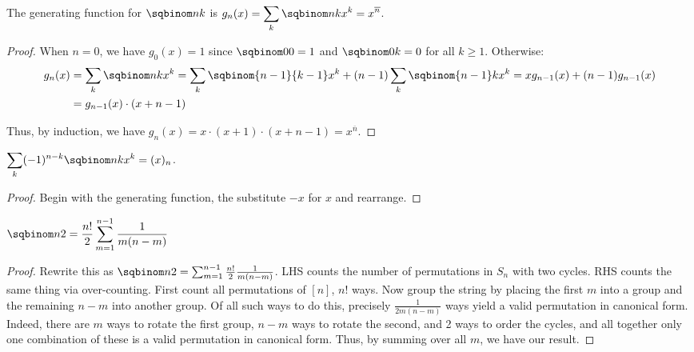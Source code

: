 \documentclass[a4paper]{article}
\begin{document}
\begin{proposition}
The generating function for $\sqbinom nk$ is $\displaystyle g_n(x)=\sum_k\sqbinom nkx^k=x^{\overline n}$.

\begin{hl}
\begin{proof}
When $n=0$, we have $g_0(x)=1$ since $\sqbinom 00=1$ and $\sqbinom 0k=0$ for all $k\geq1$. Otherwise:
\begin{align*}
g_n(x)
&= \sum_k\sqbinom nkx^k
= \sum_k\sqbinom {n-1}{k-1}x^k+(n-1)\sum_k\sqbinom{n-1}kx^k
= xg_{n-1}(x)+(n-1)g_{n-1}(x)\\
&= g_{n-1}(x)\cdot(x+n-1)
\end{align*}

Thus, by induction, we have $g_n(x)=x\cdot(x+1)\cdot(x+n-1)=x^{\overline n}$.
\end{proof}
\end{hl}
\end{proposition}

\begin{corollary}
$\displaystyle\sum_{k}(-1)^{n-k}\sqbinom nkx^k=(x)_n$.

\begin{hl}
\begin{proof}
Begin with the generating function, the substitute $-x$ for $x$ and rearrange.
\end{proof}
\end{hl}
\end{corollary}

\begin{proposition}
$\displaystyle\sqbinom n2=\frac{n!}2\sum_{m=1}^{n-1}\frac1{m(n-m)}$

\begin{hl}
\begin{proof}
Rewrite this as $\sqbinom n2=\sum_{m=1}^{n-1}\frac{n!}2\frac1{m(n-m)}$. LHS counts the number of permutations in $S_n$ with two cycles. RHS counts the same thing via over-counting. First count all permutations of $[n]$, $n!$ ways. Now group the string by placing the first $m$ into a group and the remaining $n-m$ into another group. Of all such ways to do this, precisely $\frac1{2m(n-m)}$ ways yield a valid permutation in canonical form. Indeed, there are $m$ ways to rotate the first group, $n-m$ ways to rotate the second, and 2 ways to order the cycles, and all together only one combination of these is a valid permutation in canonical form. Thus, by summing over all $m$, we have our result.
\end{proof}
\end{hl}
\end{proposition}
\end{document}
